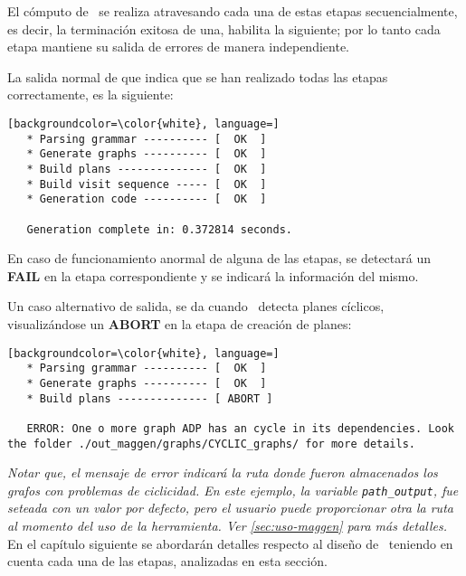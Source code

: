 El cómputo de \maggen\ se realiza atravesando cada una de estas etapas secuencialmente, es decir, la terminación exitosa de una, habilita la siguiente; por lo tanto cada etapa mantiene su salida de errores de manera independiente. 

La salida normal de \maggen que indica que se han realizado todas las etapas correctamente, es la siguiente:

\vspace{0.3cm}
\begin{lstlisting}[backgroundcolor=\color{white}, language=]
   * Parsing grammar ---------- [  OK  ]
   * Generate graphs ---------- [  OK  ]
   * Build plans -------------- [  OK  ]
   * Build visit sequence ----- [  OK  ]
   * Generation code ---------- [  OK  ]

   Generation complete in: 0.372814 seconds.
\end{lstlisting}
\vspace{0.3cm}

En caso de funcionamiento anormal de alguna de las etapas, se detectará un \textbf{FAIL} en la etapa correspondiente y se indicará la información del mismo.

Un caso alternativo de salida, se da cuando \maggen\ detecta planes cíclicos, visualizándose un \textbf{ABORT} en la etapa de creación de planes:

\vspace{0.3cm}
\begin{lstlisting}[backgroundcolor=\color{white}, language=] 
   * Parsing grammar ---------- [  OK  ]
   * Generate graphs ---------- [  OK  ]
   * Build plans -------------- [ ABORT ]

   ERROR: One o more graph ADP has an cycle in its dependencies. Look the folder ./out_maggen/graphs/CYCLIC_graphs/ for more details.
\end{lstlisting}
\vspace{0.3cm}

\textit{Notar que, el mensaje de error indicará la ruta donde fueron almacenados los grafos con problemas de ciclicidad. En este ejemplo, la variable \texttt{path\_output}, fue seteada con un valor por defecto, pero el usuario puede proporcionar otra la ruta al momento del uso de la herramienta. Ver \ref{sec:uso-maggen} para más detalles.}\\

En el capítulo siguiente se abordarán detalles respecto al diseño de \maggen\ teniendo en cuenta cada una de las etapas, analizadas en esta sección.
